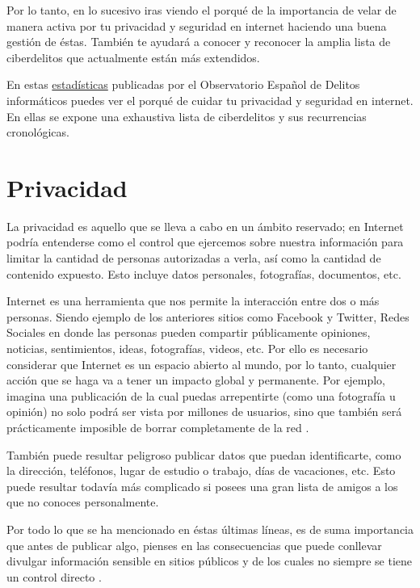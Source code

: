 \documentclass[
  a4paper,
  openany]{book}
\begin{document}
Por lo tanto, en lo sucesivo iras viendo el porqué de la importancia de velar de manera activa por tu privacidad y seguridad en internet haciendo una buena gestión de éstas. También te ayudará a conocer y reconocer la amplia lista de ciberdelitos que actualmente están más extendidos.

En estas \href{https://oedi.es/estadisticas/}{estadísticas} publicadas por el Observatorio Español de Delitos informáticos \citep{oedi} puedes ver el porqué de cuidar tu privacidad y seguridad en internet. En ellas se expone una exhaustiva lista de ciberdelitos y sus recurrencias cronológicas.

\hypertarget{privacidad}{%
\section{Privacidad}\label{privacidad}}

La privacidad es aquello que se lleva a cabo en un ámbito reservado; en Internet podría entenderse como el control que ejercemos sobre nuestra información para limitar la cantidad de personas autorizadas a verla, así como la cantidad de contenido expuesto. Esto incluye datos personales, fotografías, documentos, etc.

Internet es una herramienta que nos permite la interacción entre dos o más personas. Siendo ejemplo de los anteriores sitios como Facebook y Twitter, Redes Sociales en donde las personas pueden compartir públicamente opiniones, noticias, sentimientos, ideas, fotografías, videos, etc. Por ello es necesario considerar que Internet es un espacio abierto al mundo, por lo tanto, cualquier acción que se haga va a tener un impacto global y permanente. Por ejemplo, imagina una publicación de la cual puedas arrepentirte (como una fotografía u opinión) no solo podrá ser vista por millones de usuarios, sino que también será prácticamente imposible de borrar completamente de la red .

También puede resultar peligroso publicar datos que puedan identificarte, como la dirección, teléfonos, lugar de estudio o trabajo, días de vacaciones, etc. Esto puede resultar todavía más complicado si posees una gran lista de amigos a los que no conoces personalmente.

Por todo lo que se ha mencionado en éstas últimas líneas, es de suma importancia que antes de publicar algo, pienses en las consecuencias que puede conllevar divulgar información sensible en sitios públicos y de los cuales no siempre se tiene un control directo \citep{privacidad}.
\end{document}
